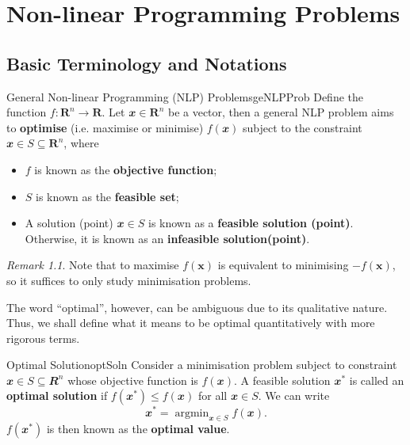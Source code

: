 \documentclass[math]{amznotes}
\theoremstyle{remark}
\newtheorem*{remark}{Remark}
\DeclareMathOperator*{\argmin}{argmin}
\begin{document}
\tableofcontents

\chapter{Non-linear Programming Problems}
\section{Basic Terminology and Notations}
\begin{dfnbox}{General Non-linear Programming (NLP) Problems}{geNLPProb}
    Define the function $f \colon \mathbf{R}^n \to \mathbf{R}$. Let $\mathbfit{x} \in \mathbf{R}^n$ be a vector, then a general NLP problem aims to {\color{red} \textbf{optimise}} (i.e. maximise or minimise) $f(\mathbfit{x})$ subject to the constraint $\mathbfit{x} \in S \subseteq \mathbf{R}^n$, where
    \begin{itemize}
        \item $f$ is known as the {\color{red} \textbf{objective function}};
        \item $S$ is known as the {\color{red} \textbf{feasible set}};
        \item A solution (point) $\mathbfit{x} \in S$ is known as a {\color{red} \textbf{feasible solution (point)}}. Otherwise, it is known as an {\color{red} \textbf{infeasible solution(point)}}. 
    \end{itemize}
\end{dfnbox}
\begin{notebox}
    \begin{remark}
        Note that to maximise $f(\mathbf{x})$ is equivalent to minimising $-f(\mathbf{x})$, so it suffices to only study minimisation problems.
    \end{remark}
\end{notebox}
The word ``optimal'', however, can be ambiguous due to its qualitative nature. Thus, we shall define what it means to be optimal quantitatively with more rigorous terms.
\begin{dfnbox}{Optimal Solution}{optSoln}
    Consider a minimisation problem subject to constraint $\mathbfit{x} \in S \subseteq \mathbfit{R}^n$ whose objective function is $f(\mathbfit{x})$. A feasible solution $\mathbfit{x}^*$ is called an {\color{red} \textbf{optimal solution}} if $f(\mathbfit{x}^*) \leq f(\mathbfit{x})$ for all $\mathbfit{x} \in S$. We can write
    \begin{equation*}
        \mathbfit{x}^* = \argmin_{\mathbfit{x} \in S} f(\mathbfit{x}).
    \end{equation*}
    $f(\mathbfit{x}^*)$ is then known as the {\color{red} \textbf{optimal value}}.
\end{dfnbox}
\end{document}
